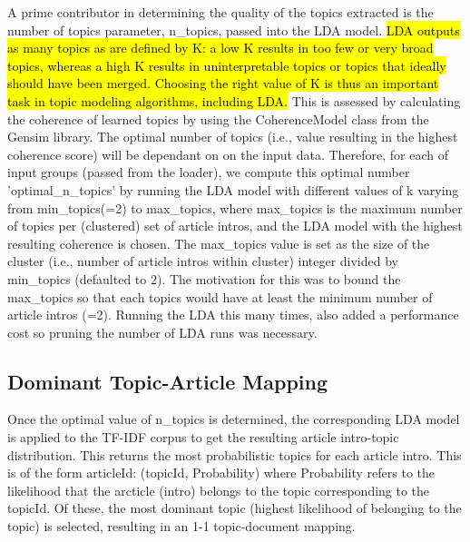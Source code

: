 A prime contributor in determining the quality of the topics extracted is the number of topics parameter, n\_topics, passed into the LDA model. 
\hl{LDA outputs as many topics as are defined by
K: a low K results in too few or very broad topics, whereas a
high K results in uninterpretable topics or topics that ideally
should have been merged. Choosing the right value of K is
thus an important task in topic modeling algorithms, including
LDA.} \cite{topic_score}
This is assessed by calculating the coherence of learned topics by using the CoherenceModel class from the Gensim library. The optimal number of topics (i.e., value resulting in the highest coherence score) will be dependant on on the input data. Therefore, for each of input groups (passed from the loader), we compute this optimal number 'optimal\_n\_topics' by running the LDA model with different values of k varying from min\_topics(=2) to max\_topics, where max\_topics is the maximum number of topics per (clustered) set of article intros, and the LDA model with the highest resulting coherence is chosen. The max\_topics value is set as the size of the cluster (i.e., number of article intros within cluster) integer divided by min\_topics (defaulted to 2). The motivation for this was to bound the max\_topics so that each topics would have at least the minimum number of article intros (=2). Running the LDA this many times, also added a performance cost so pruning the number of LDA runs was necessary. 


\subsection{Dominant Topic-Article Mapping}
Once the optimal value of n\_topics is determined, the corresponding LDA model is applied to the TF-IDF corpus to get the resulting article intro-topic distribution. This returns the most probabilistic topics for each article intro. This is of the form articleId: (topicId, Probability) where Probability refers to the likelihood that the arcticle (intro) belongs to the topic corresponding to the topicId. Of these, the most dominant topic (highest likelihood of belonging to the topic) is selected, resulting in an 1-1 topic-document mapping. 

